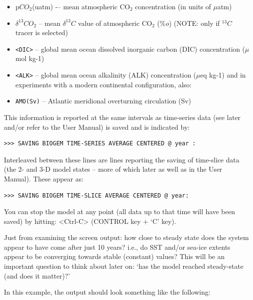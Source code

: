\documentclass[11pt,fleqn]{book} %
\begin{document}
\begin{itemize}
\item[] p\(CO_{2}\)(uatm) -– mean atmospheric CO\(_{2}\) concentration (in units of \(\mu\)atm)
\item[] \(\delta^{13}CO_{2}\)  – mean \(\delta^{13}C\) value of atmospheric CO\(_{2}\) (\%\textit{o}) (NOTE: only if \(^{13}C\) tracer is selected)
\item[] \texttt{<DIC>} -- global mean ocean dissolved inorganic carbon (DIC) concentration (\(\mu\)mol kg-1)
\item[] \texttt{<ALK>}   – global mean ocean alkalinity (ALK) concentration (\(\mu\)eq kg-1) and in experiments with a modern continental configuration, also:
\item \texttt{AMO(Sv)} -- Atlantic meridional overturning circulation (Sv)
\end{itemize}

This information is reported at the same intervals as time-series data (see later and/or refer to the User Manual) is saved and is indicated by: 

\begin{verbatim}
>>> SAVING BIOGEM TIME-SERIES AVERAGE CENTERED @ year :
\end{verbatim}

Interleaved between these lines are lines reporting the saving of time-slice data (the 2- and 3-D model states – more of which later as well as in the User Manual). These appear as:

\begin{verbatim}
>>> SAVING BIOGEM TIME-SLICE AVERAGE CENTERED @ year:
\end{verbatim}

You can stop the model at any point (all data up to that time will have been saved) by hitting: \textsf{<Ctrl-C>} (\textsf{CONTROL} key + ‘\textsf{C}’ key).

Just from examining the screen output: how close to steady state does the system appear to have come after just 10 years? i.e., do SST and/or sea-ice extents appear to be converging towards stable (constant) values? This will be an important question to think about later on: ‘has the model reached steady-state (and does it matter)?’

In this example, the output should look something like the following:

\newpage
\end{document}
